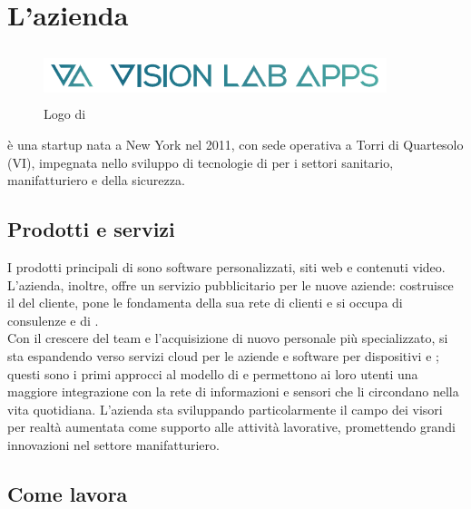 \chapter{L'azienda\label{cap:lazienda}}
\begin{figure}[H]
   \begin{center}
      \includegraphics[width=10cm,height=1.5cm,keepaspectratio]{immagini/vla-logo}
   \end{center}
   \caption{Logo di \nomeAziendaComm{}}\label{logovla}
\end{figure}
\nomeAziendaComm{} è una startup nata a New York nel 2011, con sede operativa a Torri di Quartesolo (VI), impegnata nello sviluppo di tecnologie di  per i settori sanitario, manifatturiero e della sicurezza.

\section{Prodotti e servizi}
I prodotti principali di \nomeAzienda{} sono software personalizzati, siti web e contenuti video. L'azienda, inoltre, offre un servizio pubblicitario per le nuove aziende: costruisce il  del cliente, pone le fondamenta della sua rete di clienti e si occupa di consulenze e di .
\\
Con il crescere del team e l'acquisizione di nuovo personale più specializzato, \nomeAzienda{} si sta espandendo verso servizi cloud per le aziende e software per dispositivi  e ; questi sono i primi approcci al modello di  e permettono ai loro utenti una maggiore integrazione con la rete di informazioni e sensori che li circondano nella vita quotidiana. L'azienda sta sviluppando particolarmente il campo dei visori per realtà aumentata come supporto alle attività lavorative, promettendo grandi innovazioni nel settore manifatturiero.

\section{Come lavora}

